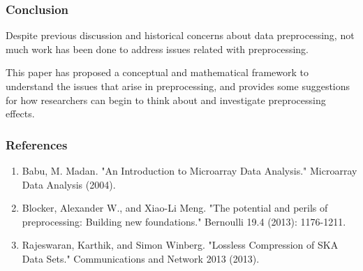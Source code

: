 \documentclass[10pt, compress]{beamer}
\begin{document}
\begin{frame}[fragile]
    \frametitle{Conclusion}
    
    Despite previous discussion and historical concerns about data preprocessing, not much work has been done to address issues related with preprocessing.
    
    \vspace*{3mm}
    
    This paper has proposed a conceptual and mathematical framework to understand the issues that arise in preprocessing, and provides some suggestions for how researchers can begin to think about and investigate preprocessing effects. 
  
\end{frame}
\begin{frame}[fragile]
    \frametitle{References}
    
    \begin{enumerate}
        \item Babu, M. Madan. "An Introduction to Microarray Data Analysis." Microarray Data Analysis (2004).
    	\item Blocker, Alexander W., and Xiao-Li Meng. "The potential and perils of preprocessing: Building new foundations." Bernoulli 19.4 (2013): 1176-1211.
		\item Rajeswaran, Karthik, and Simon Winberg. "Lossless Compression of SKA Data Sets." Communications and Network 2013 (2013).
	\end{enumerate}
  
\end{frame}
\end{document}
